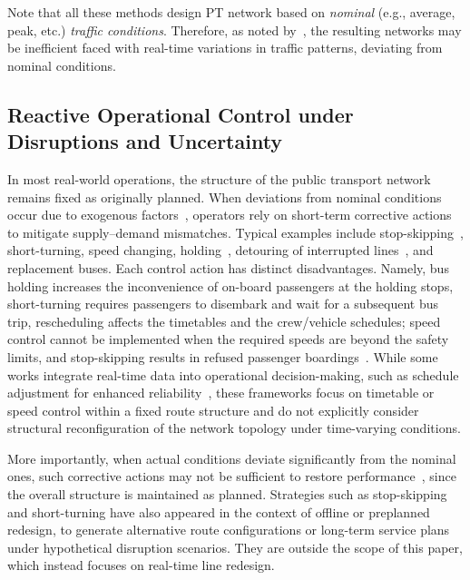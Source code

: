 \documentclass[a4paper,fleqn]{cas-sc}
\begin{document}
Note that all these methods design PT network based on \emph{nominal} (e.g., average, peak, etc.) \emph{traffic conditions}.
Therefore, as noted by~\citep{tan2024optimizing}, the resulting networks may be inefficient faced with real-time variations in traffic patterns, deviating from nominal conditions. 

\subsection{Reactive Operational Control under Disruptions and Uncertainty}
\label{sec:reactive}

In most real-world operations, the structure of the public transport network remains fixed as originally planned. 
When deviations from nominal conditions occur due to exogenous factors~\citep{nissen2020does, chen2009analyzing}, 
operators rely on short-term corrective actions to mitigate supply--demand mismatches.
Typical examples include stop-skipping~\citep{peled2021quality}, short-turning, 
speed changing, holding~\citep{tang2018optimal, manasra2019optimization, gkiotsalitis2020public, olvera2023holding}, 
detouring of interrupted lines~\citep{zheng2023multi}, and replacement buses.
Each control action has distinct disadvantages.
Namely, bus holding increases the inconvenience of on-board passengers at the holding stops, short-turning requires passengers to disembark and wait for a subsequent bus trip, rescheduling affects the timetables and the crew/vehicle schedules; speed control cannot be implemented when the required speeds are beyond the safety limits, and stop-skipping results in refused passenger boardings~\citep{gkiotsalitis2021stop}.
While some works integrate real-time data into operational decision-making, such as schedule adjustment for enhanced reliability~\citep{cao2019real}, these frameworks focus on timetable or speed control within a fixed route structure and do not explicitly consider structural reconfiguration of the network topology under time-varying conditions.

More importantly, when actual conditions deviate significantly from the nominal ones, such corrective actions may not be sufficient to restore performance~\citep{guo2024restoring}, since the overall structure is maintained as planned.
%
Strategies such as stop-skipping and short-turning have also appeared in the context of offline or preplanned redesign, to generate alternative route configurations or long-term service plans under hypothetical disruption scenarios. They are outside the scope of this paper, which instead focuses on real-time line redesign.
\end{document}
